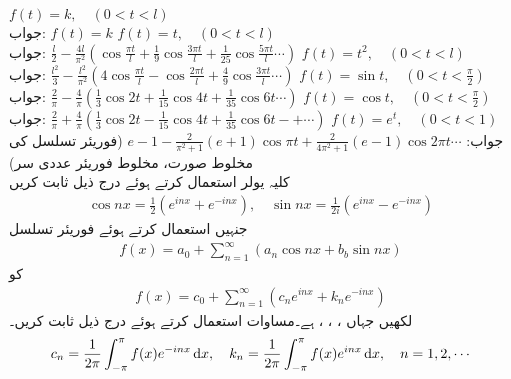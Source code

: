 \quad
$f(t)=k,\quad (0<t<l)$\\
جواب:\quad
$f(t)=k$
\quad
$f(t)=t,\quad (0<t<l)$\\
جواب:\quad
$\tfrac{l}{2}-\tfrac{4l}{\pi^2}(\cos \tfrac{\pi t}{l}+\tfrac{1}{9}\cos \tfrac{3\pi t}{l}+\tfrac{1}{25}\cos \tfrac{5\pi t}{l}\cdots)$
\quad
$f(t)=t^2,\quad (0<t<l)$\\
جواب:\quad
$\tfrac{l^2}{3}-\tfrac{l^2}{\pi^2}(4\cos \tfrac{\pi t}{l}-\cos \tfrac{2\pi t}{l}+\tfrac{4}{9}\cos \tfrac{3\pi t}{l}\cdots)$
\quad
$f(t)=\sin t,\quad (0<t<\tfrac{\pi}{2})$\\
جواب:\quad
$\tfrac{2}{\pi}-\tfrac{4}{\pi}(\tfrac{1}{3}\cos 2t+\tfrac{1}{15}\cos 4t+\tfrac{1}{35}\cos 6t\cdots)$
\quad
$f(t)=\cos t,\quad (0<t<\tfrac{\pi}{2})$\\
جواب:\quad
$\tfrac{2}{\pi}+\tfrac{4}{\pi}(\tfrac{1}{3}\cos 2t-\tfrac{1}{15}\cos 4t+\tfrac{1}{35}\cos 6t-+\cdots)$
\quad
$f(t)=e^t,\quad (0<t<1)$\\
جواب:\quad
$e-1-\tfrac{2}{\pi^2+1}(e+1)\cos \pi t+\tfrac{2}{4\pi^2+1}(e-1)\cos 2\pi t\cdots$
\quad (فوریئر تسلسل کی مخلوط صورت، مخلوط فوریئر عددی سر)\\
کلیہ یولر   استعمال کرتے ہوئے درج ذیل ثابت کریں
\begin{align*}
\cos nx=\frac{1}{2}(e^{inx}+e^{-inx}),\quad \sin nx=\frac{1}{2i}(e^{inx}-e^{-inx})
\end{align*}
جنہیں استعمال کرتے ہوئے فوریئر تسلسل
\begin{align*}
f(x)=a_0+\sum_{n=1}^{\infty} (a_n\cos nx+b_b\sin nx)
\end{align*}
کو
\begin{align}\label{مساوات_فوریئر_مخلوط_الف}
f(x)=c_0+\sum_{n=1}^{\infty}(c_ne^{inx}+k_ne^{-inx})
\end{align}
لکھیں جہاں ، ، ،  ہے۔مساوات  استعمال کرتے ہوئے درج ذیل ثابت کریں۔
\begin{align*}
c_n=\frac{1}{2\pi}\int_{-\pi}^{\pi} f(x)e^{-inx}\dif x,\quad k_n=\frac{1}{2\pi}\int_{-\pi}^{\pi} f(x)e^{inx}\dif x,\quad n=1,2,\cdots
\end{align*}
